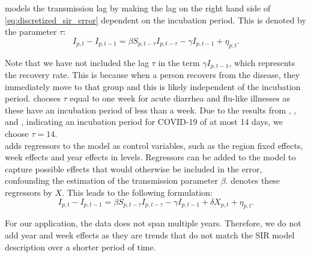 \documentclass[12pt]{article}
\begin{document}
	\textcite{adda2016economic} models the transmission lag by making the lag on the right hand side of \eqref{eq:discretized_sir_error} dependent on the incubation period. This is denoted by the parameter $\tau$:
	    \begin{equation}\label{eq:discretized_sir_tau}
	        I_{p,t} - I_{p,t-1} = \beta S_{p,t-\tau}I_{p,t-\tau} - \gamma I_{p,t-1} + \eta_{p,t}.
	    \end{equation}
	
	Note that we have not included the lag $\tau$ in the term $\gamma I_{p,t-1}$, which represents the recovery rate. This is because when a person recovers from the disease, they immediately move to that group and this is likely independent of the incubation period. \textcite{adda2016economic} chooses $\tau$ equal to one week for acute diarrhea and flu-like illnesses as these have an incubation period of less than a week. Due to the results from \textcite{lauer2020incubation}, \textcite{li2020incubation}, and \textcite{linton2020incubation}, indicating an incubation period for COVID-19 of at most 14 days, we choose $\tau = 14$. \\
	
	\textcite{adda2016economic} adds regressors to the model as control variables, such as the region fixed effects, week effects and year effects in levels. Regressors can be added to the model to capture possible effects that would otherwise be included in the error, confounding the estimation of the transmission parameter $\beta$. \textcite{adda2016economic} denotes these regressors by $X$. This leads to the following formulation:
	    \begin{equation}\label{eq:discretized_sir_regressors}
        	I_{p,t} - I_{p,t-1} = \beta S_{p,t-\tau}I_{p,t-\tau} - \gamma I_{p,t-1} + \delta X_{p,t} + \eta_{p,t}.
    	\end{equation}
    	
	For our application, the data does not span multiple years. Therefore, we do not add year and week effects as they are trends that do not match the SIR model description over a shorter period of time. \\
	
\end{document}
